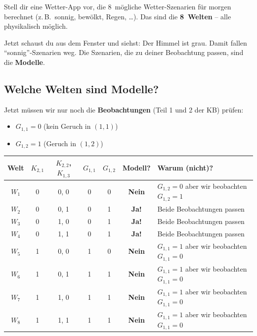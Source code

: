 \documentclass[a4paper,12pt]{article}
\begin{document}
\begin{analogie}[title={Analogie: Wetter-App}]
Stell dir eine Wetter-App vor, die 8~m\"ogliche Wetter-Szenarien
f\"ur morgen berechnet (z.\,B.\ sonnig, bew\"olkt, Regen, \ldots).
Das sind die \textbf{8~Welten} -- alle physikalisch m\"oglich.

\medskip
Jetzt schaust du aus dem Fenster und siehst: Der Himmel ist grau.
Damit fallen "`sonnig"'-Szenarien weg. Die Szenarien, die zu deiner
Beobachtung passen, sind die \textbf{Modelle}.
\end{analogie}


\subsection{Welche Welten sind Modelle?}

Jetzt m\"ussen wir nur noch die \textbf{Beobachtungen} (Teil 1 und 2 der KB) pr\"ufen:
\begin{itemize}
\item $G_{1,1} = 0$ (kein Geruch in $(1{,}1)$)
\item $G_{1,2} = 1$ (Geruch in $(1{,}2)$)
\end{itemize}

\begin{center}
\renewcommand{\arraystretch}{1.4}
\begin{tabular}{c|cc|cc|c|l}
\toprule
Welt & $K_{2,1}$ & $K_{2,2}$, $K_{1,3}$
     & $G_{1,1}$ & $G_{1,2}$ & Modell? & Warum (nicht)? \\
\midrule
$W_1$ & 0 & 0, 0 & 0 & 0 & \textbf{Nein} & $G_{1,2}=0$ aber wir beobachten $G_{1,2}=1$ \\
$W_2$ & 0 & 0, 1 & 0 & 1 & \textbf{Ja!} & Beide Beobachtungen passen \\
$W_3$ & 0 & 1, 0 & 0 & 1 & \textbf{Ja!} & Beide Beobachtungen passen \\
$W_4$ & 0 & 1, 1 & 0 & 1 & \textbf{Ja!} & Beide Beobachtungen passen \\
$W_5$ & 1 & 0, 0 & 1 & 0 & \textbf{Nein} & $G_{1,1}=1$ aber wir beobachten $G_{1,1}=0$ \\
$W_6$ & 1 & 0, 1 & 1 & 1 & \textbf{Nein} & $G_{1,1}=1$ aber wir beobachten $G_{1,1}=0$ \\
$W_7$ & 1 & 1, 0 & 1 & 1 & \textbf{Nein} & $G_{1,1}=1$ aber wir beobachten $G_{1,1}=0$ \\
$W_8$ & 1 & 1, 1 & 1 & 1 & \textbf{Nein} & $G_{1,1}=1$ aber wir beobachten $G_{1,1}=0$ \\
\bottomrule
\end{tabular}
\end{center}
\end{document}

